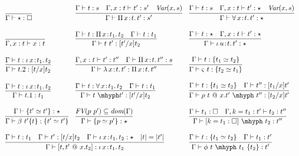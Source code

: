 \documentclass{article}
\newcommand{\abs}[4]{{#1}\, #2\! : \! #3.\, #4}
\begin{document}
\begin{figure}
  \[
  \begin{array}{lll}
    \infer{\Gamma\vdash \star : \Box}{\ } &
    \infer{\Gamma\vdash\abs{\Pi}{x}{t}{t'} : s'}{\Gamma \vdash t : s \quad \Gamma,x:t\vdash t' : s' \quad \textit{Var}(x,s)} &
    \infer{\Gamma\vdash\abs{\forall}{x}{t}{t'} : \star}{\Gamma \vdash t : s \quad \Gamma,x:t\vdash t' : \star \quad \textit{Var}(x,s)} 
    \\ \\
    \infer{\Gamma, x : t \vdash x : t}{\ } &
    \infer{\Gamma\vdash t\ t' : [t'/x]t_2}{\Gamma\vdash t : \abs{\Pi}{x}{t_1}{t_2} & \Gamma\vdash t : t_1} &
    \infer{\Gamma\vdash\abs{\iota}{u}{t}{t'} : \star}{\Gamma \vdash t : \star \quad \Gamma,x:t\vdash t' : \star} 
    \\ \\
    \infer{\Gamma\vdash t.2 : [t/x]t_2}{\Gamma\vdash t : \abs{\iota}{x}{t_1}{t_2}} &    
    \infer{\Gamma\vdash\abs{\lambda}{x}{t}{t'} : \abs{\Pi}{x}{t}{t''}}{\Gamma,x:t\vdash t':t'' \quad \Gamma \vdash \abs{\Pi}{x}{t}{t''} : s}  &
    \infer{\Gamma\vdash \varsigma\ t : \{ t_2 \simeq t_1\}}{\Gamma\vdash t : \{t_1 \simeq t_2\}}

\\ \\
    \infer{\Gamma\vdash t.1 : t_1}{\Gamma\vdash t : \abs{\iota}{x}{t_1}{t_2}} &
    \infer{\Gamma\vdash t\ \mhyph t' : [t'/x]t_2}{\Gamma\vdash t : \abs{\forall}{x}{t_1}{t_2} & \Gamma\vdash t : t_1} &
    \infer{\Gamma\vdash \rho\ t\ @\ x.t'\ \mhyph\ t'' : [t_2/x]t'}{\Gamma \vdash t : \{ t_1 \simeq t_2 \} \quad \Gamma\vdash t'' : [t_1/x]t'}
    \\ \\
    \infer{\Gamma\vdash \beta\ t'\{t\} : \{ t' \simeq t'\}}{\Gamma\vdash \{ t' \simeq t' \} : \star } &
    \infer{\Gamma\vdash \{ p \simeq p'\} : \star}{\textit{FV}(p\ p')\subseteq \textit{dom}(\Gamma)} &
     \infer{\Gamma\vdash [ k = t_1 : \Box ]\ \mhyph\ t_2 : t''}{\Gamma\vdash t_1 : \Box \quad
                                                               \Gamma, k = t_1 : t' \vdash t_2 : t''}  
    \\ \\
    \multicolumn{2}{l}{
    \infer{\Gamma\vdash [t,t'\ @\ x.t_2] : \abs{\iota}{x}{t_1}{t_2}}{\Gamma\vdash t : t_1 \quad \Gamma\vdash t' : [t/x]t_2 \quad \Gamma \vdash \abs{\iota}{x}{t_1}{t_2} : \star \quad |t| = |t'|}} &  
  \infer{\Gamma\vdash \phi\ t\ \mhyph\ t_1\ \{t_2\} : t'}{\Gamma \vdash t : \{t_1 \simeq t_2\} \quad \Gamma\vdash t_1 : t'}  
    \\ \\


\end{array}\]
\end{figure}
\end{document}

